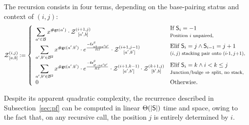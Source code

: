 The recursion consists in four terms, depending on the base-pairing status and context of $(i,j)$:
\begin{equation}
	\Z{i,j}{a,b}:=\left\{
  \begin{array}{ll}
  		\displaystyle
      \sum_{a'\in \B}  
      x^{\gc(a')}
      \cdot\Z{i+1,j}{a',b} &\begin{array}{@{}l@{}}\text{If }\Target_{i}=-1\\ \text{\relsize{-1}Position $i$ unpaired,}\end{array}\\
      \displaystyle
      \sum_{a',b'\in \B^2}
			 x^{\gc(a'.b')}
			 \cdot e^{\frac{-\ES^{\beta}_{ab \to a'b'}}{RT}}
			 \cdot \Z{i+1,j-1}{a',b'}&
\begin{array}{@{}l@{}}\text{Elif }\Target_i=j \land \Target_{i-1}=j+1\\ \text{\relsize{-1}$(i,j)$ stacking pair onto $(i$-$1,j$+$1)$,}\end{array}
			 \\
			 \displaystyle
      \sum_{a',b'\in \B^2}
      x^{\gc(a'.b')}
			\cdot e^{\frac{-\ES^{\beta}_{\varnothing\to a'b'}}{RT}}
      \cdot\Z{i+1,k-1}{a',b'}
      \cdot\Z{k+1,j}{b',b} & 
\begin{array}{@{}l@{}}\text{Elif }\Target_i=k \land i < k \leq j\\
\text{\relsize{-1}Junction/bulge $\Rightarrow$ split, no stack,}
\end{array}
\\
      0 &\text{Otherwise.}
	\end{array}\right.
\label{eq:Z_rec}
\end{equation}

Despite its apparent quadratic complexity, the recurrence described in Subsection~\ref{sec:pf} can be computed in linear $\Theta(|\text{\sf S}|)$ time and space, owing to the fact that, on any recursive call, the position $j$ is entirely determined by $i$. 

